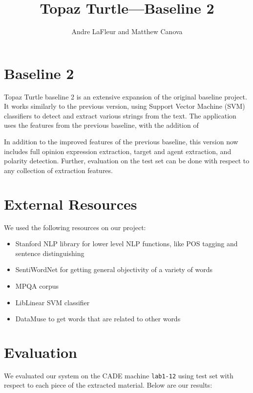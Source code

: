 \documentclass{article}
\title{Topaz Turtle---Baseline 2}
\author{Andre LaFleur and Matthew Canova}
\begin{document}
    \maketitle

    \section{Baseline 2}

    Topaz Turtle baseline 2 is an extensive expansion of the original baseline project. It works similarly to the previous version, using Support Vector Machine (SVM) classifiers to detect and extract various strings from the text. The application uses the features from the previous baseline, with the addition of %

    In addition to the improved features of the previous baseline, this version now includes full opinion expression extraction, target and agent extraction, and polarity detection. Further, evaluation on the test set can be done with respect to any collection of extraction features.

    \section{External Resources}

        We used the following resources on our project:

        \begin{itemize}
            \item Stanford NLP library for lower level NLP functions, like POS tagging and sentence distinguishing
            \item SentiWordNet for getting general objectivity of a variety of words
            \item MPQA corpus
            \item LibLinear SVM classifier
            \item DataMuse to get words that are related to other words
        \end{itemize}

    \section{Evaluation}

        We evaluated our system on the CADE machine \verb|lab1-12| using test set with respect to each piece of the extracted material. Below are our results:
\end{document}
